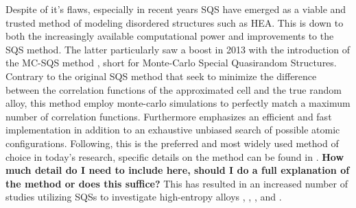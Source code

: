  
Despite of it's flaws, especially in recent years SQS have emerged as a viable and trusted method of modeling disordered structures such as HEA. This is down to both the increasingly available computational power and improvements to the SQS method. The latter particularly saw a boost in 2013 with the introduction of the MC-SQS method \cite{mcsqs2013}, short for Monte-Carlo Special Quasirandom Structures. Contrary to the original SQS method that seek to minimize the difference between the correlation functions of the approximated cell and the true random alloy, this method employ monte-carlo simulations to perfectly match a maximum number of correlation functions. Furthermore emphasizes an efficient and fast implementation in addition to an exhaustive unbiased search of possible atomic configurations. Following, this is the preferred and most widely used method of choice in today's research, specific details on the method can be found in \cite{mcsqs2013}. \textbf{How much detail do I need to include here, should I do a full explanation of the method or does this suffice?}  This has resulted in an increased number of studies utilizing SQSs to investigate high-entropy alloys \cite{WANG2021128754}, \cite{WEI2021167432}, \cite{RASHID2014285}, and \cite{SORKIN2021160776}.   






























































